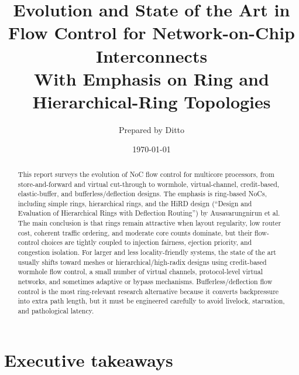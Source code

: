 \documentclass[11pt]{article}
\title{Evolution and State of the Art in Flow Control for Network-on-Chip Interconnects\\\large With Emphasis on Ring and Hierarchical-Ring Topologies}
\author{Prepared by Ditto}
\date{\today}
\begin{document}
\maketitle

\begin{abstract}
This report surveys the evolution of NoC flow control for multicore processors, from store-and-forward and virtual cut-through to wormhole, virtual-channel, credit-based, elastic-buffer, and bufferless/deflection designs. The emphasis is ring-based NoCs, including simple rings, hierarchical rings, and the HiRD design (``Design and Evaluation of Hierarchical Rings with Deflection Routing'') by Ausavarungnirun et al. The main conclusion is that rings remain attractive when layout regularity, low router cost, coherent traffic ordering, and moderate core counts dominate, but their flow-control choices are tightly coupled to injection fairness, ejection priority, and congestion isolation. For larger and less locality-friendly systems, the state of the art usually shifts toward meshes or hierarchical/high-radix designs using credit-based wormhole flow control, a small number of virtual channels, protocol-level virtual networks, and sometimes adaptive or bypass mechanisms. Bufferless/deflection flow control is the most ring-relevant research alternative because it converts backpressure into extra path length, but it must be engineered carefully to avoid livelock, starvation, and pathological latency.
\end{abstract}

\section{Executive takeaways}
\end{document}
